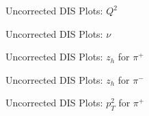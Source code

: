 \begin{frame}{Uncorrected DIS Plots: $Q^2$}
    \label{20.15a::q2}

    \begin{figure}[t]
    \end{figure}

\end{frame}

\begin{frame}{Uncorrected DIS Plots: $\nu$}
    \label{20.15b::nu}

    \begin{figure}[t]
    \end{figure}

\end{frame}

\begin{frame}{Uncorrected DIS Plots: $z_h$ for $\pi^+$}
    \label{20.15c::zh_pi+}

    \begin{figure}[t]
    \end{figure}

\end{frame}

\begin{frame}{Uncorrected DIS Plots: $z_h$ for $\pi^-$}
    \label{20.15d::zh_pi-}

    \begin{figure}[t]
    \end{figure}

\end{frame}

\begin{frame}{Uncorrected DIS Plots: $p_T^2$ for $\pi^+$}
    \label{20.15e::pt2_pi+}

    \begin{figure}[t]
    \end{figure}

\end{frame}

